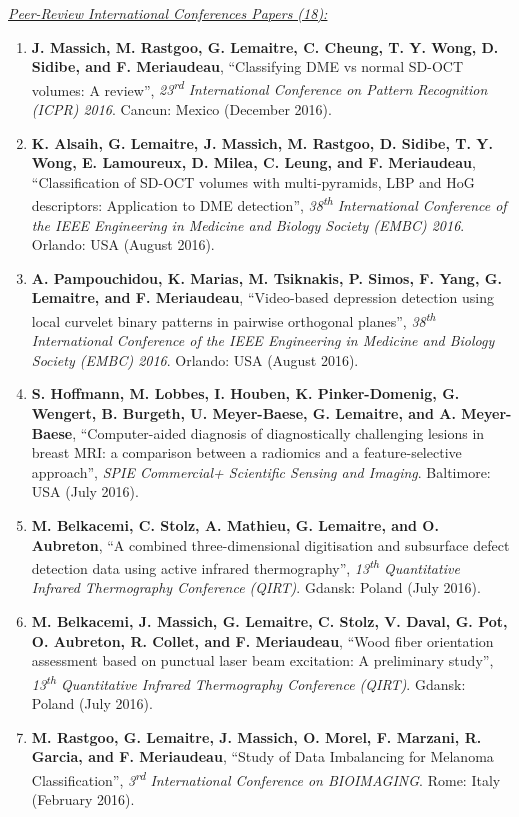 {\underline{\textit{Peer-Review International Conferences Papers (18):}}

\begin{enumerate}
\item \textbf{J. Massich, M. Rastgoo, G. Lemaitre, C. Cheung, T. Y. Wong, D. Sidibe, and F. Meriaudeau}, ``Classifying DME vs normal SD-OCT volumes: A review'', \textit{23\textsuperscript{rd} International Conference on Pattern Recognition (ICPR) 2016}. Cancun: Mexico (December 2016).
\item \textbf{K. Alsaih, G. Lemaitre, J. Massich, M. Rastgoo, D. Sidibe, T. Y. Wong, E. Lamoureux, D. Milea, C. Leung, and F. Meriaudeau}, ``Classification of SD-OCT volumes with multi-pyramids, LBP and HoG descriptors: Application to DME detection'', \textit{38\textsuperscript{th} International Conference of the IEEE Engineering in Medicine and Biology Society (EMBC) 2016}. Orlando: USA (August 2016).
\item \textbf{A. Pampouchidou, K. Marias, M. Tsiknakis, P. Simos, F. Yang, G. Lemaitre, and F. Meriaudeau}, ``Video-based depression detection using local curvelet binary patterns in pairwise orthogonal planes'', \textit{38\textsuperscript{th} International Conference of the IEEE Engineering in Medicine and Biology Society (EMBC) 2016}. Orlando: USA (August 2016).
\item \textbf{S. Hoffmann, M. Lobbes, I. Houben, K. Pinker-Domenig, G. Wengert, B. Burgeth, U. Meyer-Baese, G. Lemaitre, and A. Meyer-Baese}, ``Computer-aided diagnosis of diagnostically challenging lesions in breast MRI: a comparison between a radiomics and a feature-selective approach'', \textit{SPIE Commercial+ Scientific Sensing and Imaging}. Baltimore: USA (July 2016).
\item \textbf{M. Belkacemi, C. Stolz, A. Mathieu, G. Lemaitre, and O. Aubreton}, ``A combined three-dimensional digitisation and subsurface defect detection data using active infrared thermography'', \textit{13\textsuperscript{th} Quantitative Infrared Thermography Conference (QIRT)}. Gdansk: Poland (July 2016).
\item \textbf{M. Belkacemi, J. Massich, G. Lemaitre, C. Stolz, V. Daval, G. Pot, O. Aubreton, R. Collet, and F. Meriaudeau}, ``Wood fiber orientation assessment based on punctual laser beam excitation: A preliminary study'', \textit{13\textsuperscript{th} Quantitative Infrared Thermography Conference (QIRT)}. Gdansk: Poland (July 2016).
\item \textbf{M. Rastgoo, G. Lemaitre, J. Massich, O. Morel, F. Marzani, R. Garcia, and F. Meriaudeau}, ``Study of Data Imbalancing for Melanoma Classification'', \textit{3\textsuperscript{rd} International Conference on BIOIMAGING}. Rome: Italy (February 2016).

\end{enumerate}}
